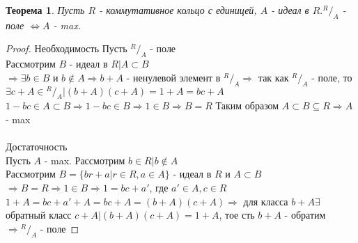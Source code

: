 \documentclass[10pt,a4paper]{article}
\newtheorem{theorem}{Теорема}
\begin{document}
				\begin{theorem}
					Пусть $R$ - коммутативное кольцо с единицей, $A$ - идеал в $R. {}^R/_A$ - поле $\Leftrightarrow A$ - max.
				\end{theorem}
				\begin{proof} Необходимость
					Пусть ${}^R/_A$ - поле\\
					Рассмотрим $B$ - идеал в $R \big| A \subset B$\\
					$\Rightarrow \exists b \in B$ и $b \notin A \Rightarrow b + A$ - ненулевой элемент в ${}^R/_A \Rightarrow$ так как ${}^R/_A$ - поле, то $\exists c+A \in {}^R/_A \big| (b+A)(c+A) = 1+A = bc + A$\\
					$1 - bc \in A \subset B \Rightarrow 1 - bc \in B \Rightarrow 1 \in B \Rightarrow B = R$
					Таким образом $A \subset B \subseteq R \Rightarrow A$ - max\\\\
					Достаточность\\
					Пусть $A$ - max. Рассмотрим $b \in R \big| b \notin A$\\
					Рассмотрим $B = \{br + a \big| r \in R, a \in A\}$ - идеал в $R$ и $A \subset B$\\
					$\Rightarrow B = R \Rightarrow 1 \in B \Rightarrow 1 = bc + a'$, где $a' \in A, c \in R$\\
					$1 + A = bc + a' + A = bc + A = (b + A)(c + A) \Rightarrow$ для класса $b+A\exists$ обратный класс $c + A \big| (b+A)(c+A) = 1+A$, тое сть $b+A$ - обратим $\Rightarrow {}^R/_A$ - поле
				\end{proof}
\end{document}
